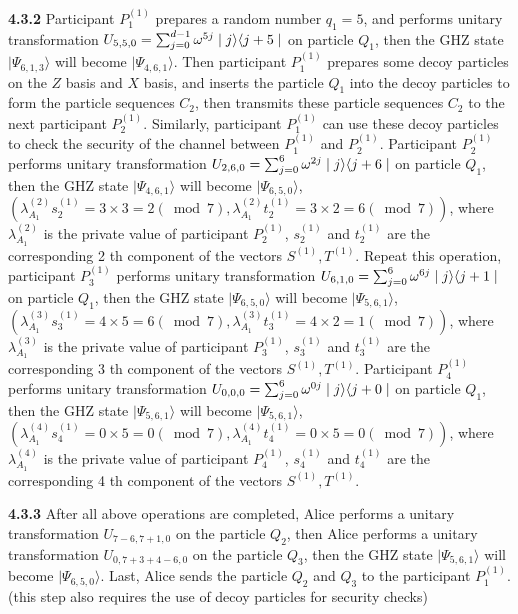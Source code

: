 \documentclass[pdflatex,sn-mathphys]{sn-jnl}%
\theoremstyle{thmstyleone}%
\theoremstyle{thmstyletwo}%
\theoremstyle{thmstylethree}%
\begin{document}
\indent\textbf{4.3.2} Participant $P_1^{(1)}$ prepares a random number $q_1=5$, and performs unitary transformation $U_{{5},{5},{0}}=\sum_{j=0}^{d-1} \omega^{5j}\mid{j}\rangle\langle{j+5}\mid\notag $ on particle $Q_1$, then the GHZ state $\mid\varPsi_{6,1,3}\rangle$  will become $\mid\varPsi_{4,6,1}\rangle$. Then participant $P_1^{(1)}$ prepares some decoy particles on the $Z$ basis and $X$ basis, and inserts the particle $Q_1$ into the decoy particles to form the particle sequences $C_2$, then transmits these particle sequences $C_2$ to the next participant $P_2^{(1)}$. Similarly, participant $P_1^{(1)}$ can use these decoy particles to check the security of the channel between $P_1^{(1)}$ and $P_2^{(1)}$. Participant $P_2^{(1)}$ performs unitary transformation
$U_{2,6,0}=\sum_{j=0}^{6} \omega^{2j}\mid{j}\rangle\langle{j+6}\mid\notag$ on particle $Q_1$, then the GHZ state $\mid\varPsi_{4,6,1}\rangle$ will become 
$\mid\varPsi_{6,5,0}\rangle$,  $(\lambda_{A_1}^{(2)}s_2^{(1)}=3\times3=2(\bmod{7}), \lambda_{A_1}^{(2)}t_2^{(1)}=3\times2=6(\bmod{7}))$, where $\lambda_{A_1}^{(2)}$ is the private value of participant $P_2^{(1)}$, $s_2^{(1)}$ and $t_2^{(1)}$ are the corresponding 2 th component of the vectors $S^{(1)},T^{(1)}$. Repeat this operation, participant $P_3^{(1)}$ performs unitary transformation
$U_{6,1,0}=\sum_{j=0}^{6} \omega^{6j}\mid{j}\rangle\langle{j+1}\mid\notag$ on particle $Q_1$, then the GHZ state $\mid\varPsi_{6,5,0}\rangle$ will become 
$\mid\varPsi_{5,6,1}\rangle$,  $(\lambda_{A_1}^{(3)}s_3^{(1)}=4\times5=6(\bmod{7}), \lambda_{A_1}^{(3)}t_3^{(1)}=4\times2=1(\bmod{7}))$, where $\lambda_{A_1}^{(3)}$ is the private value of participant $P_3^{(1)}$, $s_3^{(1)}$ and $t_3^{(1)}$ are the corresponding 3 th component of the vectors $S^{(1)},T^{(1)}$. Participant $P_4^{(1)}$ performs unitary transformation $U_{0,0,0}=\sum_{j=0}^{6} \omega^{0j}\mid{j}\rangle\langle{j+0}\mid\notag$
on particle $Q_1$, then the GHZ state $\mid\varPsi_{5,6,1}\rangle$ will become 
$\mid\varPsi_{5,6,1}\rangle$,  $(\lambda_{A_1}^{(4)}s_4^{(1)}=0\times5=0(\bmod{7}), \lambda_{A_1}^{(4)}t_4^{(1)}=0\times5=0(\bmod{7}))$, where $\lambda_{A_1}^{(4)}$ is the private value of participant $P_4^{(1)}$, $s_4^{(1)}$ and $t_4^{(1)}$ are the corresponding 4 th component of the vectors $S^{(1)},T^{(1)}$.

\indent\textbf{4.3.3} After all above operations are completed, Alice performs a unitary transformation $U_{{7-6},{7+1},{0}}$ on the particle $Q_2$, then Alice performs a unitary transformation $U_{{0},{7+3+4-6},{0}}$ on the particle $Q_3$, then the GHZ state 
$\mid\varPsi_{5,6,1}\rangle$ will become 
$\mid\varPsi_{6,5,0}\rangle$. Last, Alice sends the particle $Q_2$ and $Q_3$ to the participant $P_1^{(1)}$. (this step also requires the use of decoy particles for security checks)
\end{document}

